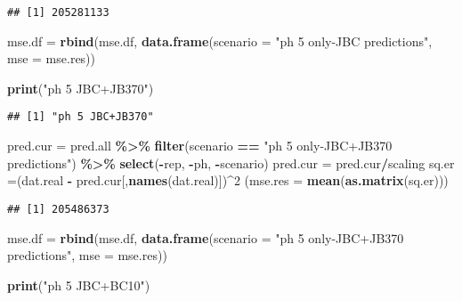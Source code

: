 \documentclass[
]{article}
\newenvironment{Shaded}{\begin{snugshade}}{\end{snugshade}}
\newcommand{\AttributeTok}[1]{\textcolor[rgb]{0.13,0.29,0.53}{#1}}
\newcommand{\DecValTok}[1]{\textcolor[rgb]{0.00,0.00,0.81}{#1}}
\newcommand{\FunctionTok}[1]{\textcolor[rgb]{0.13,0.29,0.53}{\textbf{#1}}}
\newcommand{\NormalTok}[1]{#1}
\newcommand{\OtherTok}[1]{\textcolor[rgb]{0.56,0.35,0.01}{#1}}
\newcommand{\SpecialCharTok}[1]{\textcolor[rgb]{0.81,0.36,0.00}{\textbf{#1}}}
\newcommand{\StringTok}[1]{\textcolor[rgb]{0.31,0.60,0.02}{#1}}
\begin{document}
\begin{verbatim}
## [1] 205281133
\end{verbatim}

\begin{Shaded}
\begin{Highlighting}[]
\NormalTok{mse.df }\OtherTok{=} \FunctionTok{rbind}\NormalTok{(mse.df, }\FunctionTok{data.frame}\NormalTok{(}\AttributeTok{scenario =} \StringTok{"ph 5 only{-}JBC predictions"}\NormalTok{,}
                                  \AttributeTok{mse =}\NormalTok{ mse.res))}

\FunctionTok{print}\NormalTok{(}\StringTok{"ph 5 JBC+JB370"}\NormalTok{)}
\end{Highlighting}
\end{Shaded}

\begin{verbatim}
## [1] "ph 5 JBC+JB370"
\end{verbatim}

\begin{Shaded}
\begin{Highlighting}[]
\NormalTok{pred.cur }\OtherTok{=}\NormalTok{ pred.all }\SpecialCharTok{\%\textgreater{}\%} 
  \FunctionTok{filter}\NormalTok{(scenario }\SpecialCharTok{==} \StringTok{"ph 5 only{-}JBC+JB370 predictions"}\NormalTok{) }\SpecialCharTok{\%\textgreater{}\%} 
  \FunctionTok{select}\NormalTok{(}\SpecialCharTok{{-}}\NormalTok{rep, }\SpecialCharTok{{-}}\NormalTok{ph, }\SpecialCharTok{{-}}\NormalTok{scenario)}
\NormalTok{pred.cur }\OtherTok{=}\NormalTok{ pred.cur}\SpecialCharTok{/}\NormalTok{scaling}
\NormalTok{sq.er }\OtherTok{=}\NormalTok{(dat.real }\SpecialCharTok{{-}}\NormalTok{ pred.cur[,}\FunctionTok{names}\NormalTok{(dat.real)])}\SpecialCharTok{\^{}}\DecValTok{2}
\NormalTok{(}\AttributeTok{mse.res =} \FunctionTok{mean}\NormalTok{(}\FunctionTok{as.matrix}\NormalTok{(sq.er)))}
\end{Highlighting}
\end{Shaded}

\begin{verbatim}
## [1] 205486373
\end{verbatim}

\begin{Shaded}
\begin{Highlighting}[]
\NormalTok{mse.df }\OtherTok{=} \FunctionTok{rbind}\NormalTok{(mse.df, }\FunctionTok{data.frame}\NormalTok{(}\AttributeTok{scenario =} \StringTok{"ph 5 only{-}JBC+JB370 predictions"}\NormalTok{,}
                                  \AttributeTok{mse =}\NormalTok{ mse.res))}

\FunctionTok{print}\NormalTok{(}\StringTok{"ph 5 JBC+BC10"}\NormalTok{)}
\end{Highlighting}
\end{Shaded}
\end{document}
